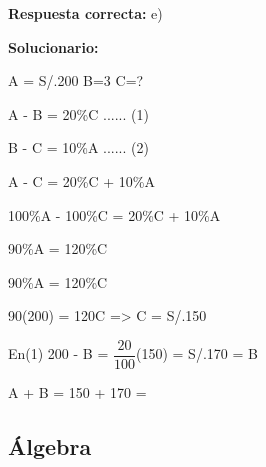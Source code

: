 \begin{enumerate}
	\textbf{Respuesta correcta:} e)
	
	\vspace{2mm}
	\textbf{Solucionario:}
	
	A = S/.200 B=3 C=?
	
	A - B = 20\%C ...... (1)
	
	B - C = 10\%A ...... (2)
	
	A - C = 20\%C + 10\%A
	
	100\%A - 100\%C = 20\%C + 10\%A
	
	90\%A = 120\%C
	
	90\%A = 120\%C
	
	90(200) = 120C => C = S/.150
	
	En(1) 200 - B =  $\dfrac{20}{100}$(150) = S/.170 = B
	
	A + B = 150 + 170 =
	
	
	
	\vspace{6mm}
	
\end{enumerate}



\subsection*{Álgebra}

